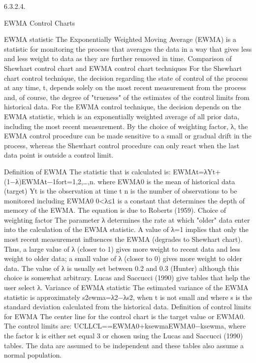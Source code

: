 6.3.2.4.

EWMA Control Charts

EWMA statistic	The Exponentially Weighted Moving Average (EWMA) is a statistic for monitoring the process that averages the data in a way that gives less and less weight to data as they are further removed in time.
Comparison of Shewhart control chart and EWMA control chart techniques	For the Shewhart chart control technique, the decision regarding the state of control of the process at any time, t, depends solely on the most recent measurement from the process and, of course, the degree of "trueness" of the estimates of the control limits from historical data. For the EWMA control technique, the decision depends on the EWMA statistic, which is an exponentially weighted average of all prior data, including the most recent measurement.
By the choice of weighting factor, λ, the EWMA control procedure can be made sensitive to a small or gradual drift in the process, whereas the Shewhart control procedure can only react when the last data point is outside a control limit.

Definition of EWMA	The statistic that is calculated is:
EWMAt=λYt+(1−λ)EWMAt−1fort=1,2,…,n.
where
EWMA0 is the mean of historical data (target)
Yt is the observation at time t
n is the number of observations to be monitored including EWMA0
0<λ≤1 is a constant that determines the depth of memory of the EWMA.
The equation is due to Roberts (1959).
Choice of weighting factor	The parameter λ determines the rate at which "older" data enter into the calculation of the EWMA statistic. A value of λ=1 implies that only the most recent measurement influences the EWMA (degrades to Shewhart chart). Thus, a large value of λ (closer to 1) gives more weight to recent data and less weight to older data; a small value of λ (closer to 0) gives more weight to older data. The value of λ is usually set between 0.2 and 0.3 (Hunter) although this choice is somewhat arbitrary. Lucas and Saccucci (1990) give tables that help the user select λ.
Variance of EWMA statistic	The estimated variance of the EWMA statistic is approximately
s2ewma=λ2−λs2,
when t is not small and where s is the standard deviation calculated from the historical data.
Definition of control limits for EWMA	The center line for the control chart is the target value or EWMA0. The control limits are:
UCLLCL==EWMA0+ksewmaEWMA0−ksewma,
where the factor k is either set equal 3 or chosen using the Lucas and Saccucci (1990) tables. The data are assumed to be independent and these tables also assume a normal population.

